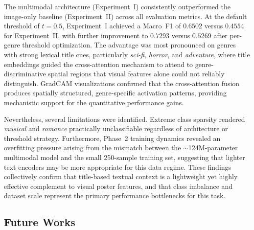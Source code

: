 \documentclass[conference]{IEEEtran}
\begin{document}
The multimodal architecture (Experiment~I) consistently 
outperformed the image-only baseline (Experiment~II) across all 
evaluation metrics. At the default threshold of $t = 0.5$, 
Experiment~I achieved a Macro~F1 of $0.6502$ versus $0.4554$ for 
Experiment~II, with further improvement to $0.7293$ versus 
$0.5269$ after per-genre threshold optimization. The advantage 
was most pronounced on genres with strong lexical title cues, 
particularly \textit{sci-fi}, \textit{horror}, and 
\textit{adventure}, where title embeddings guided the 
cross-attention mechanism to attend to genre-discriminative 
spatial regions that visual features alone could not reliably 
distinguish. GradCAM visualizations confirmed that the 
cross-attention fusion produces spatially structured, 
genre-specific activation patterns, providing mechanistic support 
for the quantitative performance gains.

Nevertheless, several limitations were identified. Extreme class 
sparsity rendered \textit{musical} and \textit{romance} 
practically unclassifiable regardless of architecture or threshold 
strategy. Furthermore, Phase~2 training dynamics revealed an 
overfitting pressure arising from the mismatch between the 
$\sim$124M-parameter multimodal model and the small 250-sample 
training set, suggesting that lighter text encoders may be more 
appropriate for this data regime. These findings collectively 
confirm that title-based textual context is a lightweight yet 
highly effective complement to visual poster features, and that 
class imbalance and dataset scale represent the primary 
performance bottlenecks for this task.

\subsection{Future Works}
\end{document}
